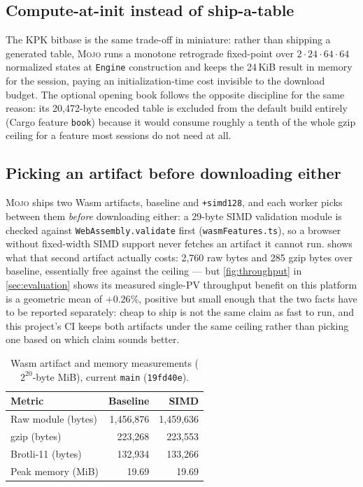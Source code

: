 \documentclass[10pt,twocolumn]{article}
\newcommand{\engine}{\textsc{Mojo}}
\newcommand{\code}[1]{\texttt{#1}}
\begin{document}
\subsection{Compute-at-init instead of ship-a-table}

The KPK bitbase is the same trade-off in miniature: rather than shipping a
generated table, \engine{} runs a monotone retrograde fixed-point over
$2\cdot24\cdot64\cdot64$ normalized states at \code{Engine} construction and
keeps the 24\,KiB result in memory for the session, paying an
initialization-time cost invisible to the download budget. The optional
opening book follows the opposite discipline for the same reason: its
20,472-byte encoded table is excluded from the default build entirely
(Cargo feature \code{book}) because it would consume roughly a tenth of the
whole gzip ceiling for a feature most sessions do not need at all.

\subsection{Picking an artifact before downloading either}

\engine{} ships two Wasm artifacts, baseline and \code{+simd128}, and each
worker picks between them \emph{before} downloading either: a 29-byte SIMD
validation module is checked against \code{WebAssembly.validate} first
(\code{wasmFeatures.ts}), so a browser without fixed-width SIMD support never
fetches an artifact it cannot run.  shows what that
second artifact actually costs: 2,760 raw bytes and 285 gzip bytes over
baseline, essentially free against the ceiling --- but \cref{fig:throughput}
in \cref{sec:evaluation} shows its measured single-PV throughput benefit on
this platform is a geometric mean of $+0.26\%$, positive but small enough
that the two facts have to be reported separately: cheap to ship is not the
same claim as fast to run, and this project's CI keeps both artifacts under
the same ceiling rather than picking one based on which claim sounds better.

\begin{table}[t]
\centering
\small
\caption{Wasm artifact and memory measurements ($2^{20}$-byte MiB), current
\code{main} (\code{19fd40e}).}
\label{tab:artifacts}
\begin{tabular}{@{}lrr@{}}
\toprule
Metric & Baseline & SIMD \\
\midrule
Raw module (bytes) & 1,456,876 & 1,459,636 \\
gzip (bytes) & 223,268 & 223,553 \\
Brotli-11 (bytes) & 132,934 & 133,266 \\
Peak memory (MiB) & 19.69 & 19.69 \\
\bottomrule
\end{tabular}
\end{table}
\end{document}
